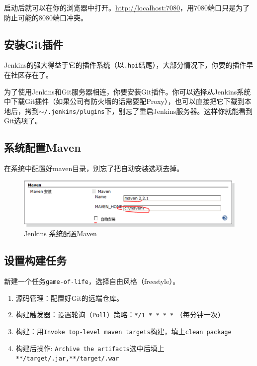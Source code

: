 启动后就可以在你的浏览器中打开。\href{http://localhost:7080}{http:/\slash localhost:7080}，用7080端口只是为了防止可能的8080端口冲突。

\subsection{安装Git插件}
\label{安装git插件}

Jenkins的强大得益于它的插件系统（以\texttt{.hpi}结尾），大部分情况下，你要的插件早在社区存在了。

为了使用Jenkins和Git服务器相连，你要安装Git插件。你可以选择从Jenkins系统中下载Git插件（如果公司有防火墙的话需要配Proxy），也可以直接把它下载到本地后，拷到\texttt{\ensuremath{\sim}\slash .jenkins\slash plugins}下，别忘了重启Jenkins服务器。这样你就能看到Git选项了。

\subsection{系统配置Maven}
\label{系统配置maven}

在系统中配置好maven目录，别忘了把自动安装选项去掉。

\begin{figure}[htbp]
\centering
\includegraphics[keepaspectratio,width=\textwidth,height=0.75\textheight]{img/18333fig0304-tn.png}
\caption{Jenkins 系统配置Maven}
\end{figure}

\subsection{设置构建任务}
\label{设置构建任务}

新建一个任务\texttt{game-of-life}，选择自由风格（freestyle）。

\begin{enumerate}
\item 源码管理：配置好Git的远端仓库。

\item 构建触发器：设置轮询（\texttt{Poll}）策略：\texttt{*\slash 1 * * * *} （每分钟一次）

\item 构建：用\texttt{Invoke top-level maven targets}构建，填上\texttt{clean package}

\item 构建后操作: \texttt{Archive the artifacts}选中后填上\texttt{**\slash target\slash *.jar,**\slash target\slash *.war}

\end{enumerate}

